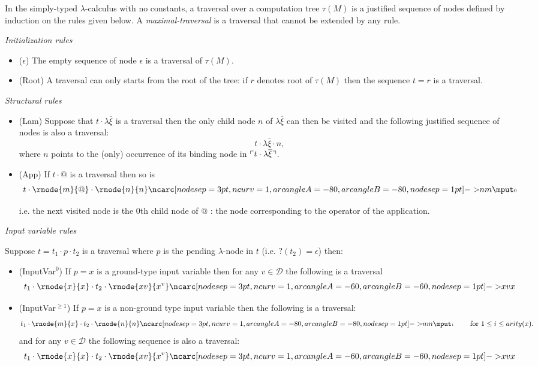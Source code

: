 \begin{dfn}
\label{def:traversal}
In the simply-typed $\lambda$-calculus with no constants,
a traversal over a computation tree $\tau(M)$
is a justified sequence of nodes defined by induction on the rules
given below. A \emph{maximal-traversal} is a traversal that cannot be
extended by any rule.

\emph{Initialization rules}
\begin{itemize}
\item ($\epsilon$) The empty sequence of node $\epsilon$ is a traversal of $\tau(M)$.

\item (Root) A traversal can only starts from the root of the tree: if $r$ denotes root of $\tau(M)$ then the sequence $t = r$
is a traversal.
\end{itemize}


\emph{Structural rules}
\begin{itemize}
\item (Lam) Suppose that $t \cdot \lambda \overline{\xi}$ is a traversal then the only child
node $n$ of $\lambda \overline{\xi}$ can then be visited and the
following justified sequence of nodes is also a traversal:
$$t \cdot \lambda \overline{\xi} \cdot n,$$
where $n$ points to the (only) occurrence of its binding node in $\ulcorner t \cdot \lambda \overline{\xi} \urcorner$.

\item (App) If $t \cdot @$ is a traversal then so is
$$t \cdot \rnode{m}{@} \cdot
\rnode{n}{n} \bkptra[nodesep=1pt]{80}{n}{m} \bklabelb{0}
$$

i.e. the next visited node is the $0$th child node of $@$ : the
node corresponding to the operator of the application.
\end{itemize}

\emph{Input variable rules}

Suppose $t = t_1 \cdot p \cdot t_2$ is a traversal where $p$ is the pending $\lambda$-node in $t$ (i.e. $?(t_2)=\epsilon$) then:
\begin{itemize}
\item (InputVar$^0$) If $p = x$ is a ground-type input variable then for any $v \in \mathcal{D}$
the following is a traversal
$$t_1 \cdot \rnode{x}{x} \cdot t_2 \cdot \rnode{xv}{x^v}
\bkptra[nodesep=1pt]{60}{xv}{x}$$


\item (InputVar$^{\geq 1}$) If $p = x$ is a non-ground type input variable then the following is a traversal:
$$t_1 \cdot \rnode{m}{x} \cdot t_2 \cdot
\rnode{n}{n} \bkptra[nodesep=1pt]{80}{n}{m} \bklabelb{i} \qquad
\mbox{ for } 1 \leq i \leq arity(x).$$
and for any $v\in \mathcal{D}$ the following sequence is also a traversal:
$$t_1 \cdot \rnode{x}{x} \cdot t_2 \cdot \rnode{xv}{x^v}
\bkptra[nodesep=1pt]{60}{xv}{x}$$
\end{itemize}


\end{dfn}
